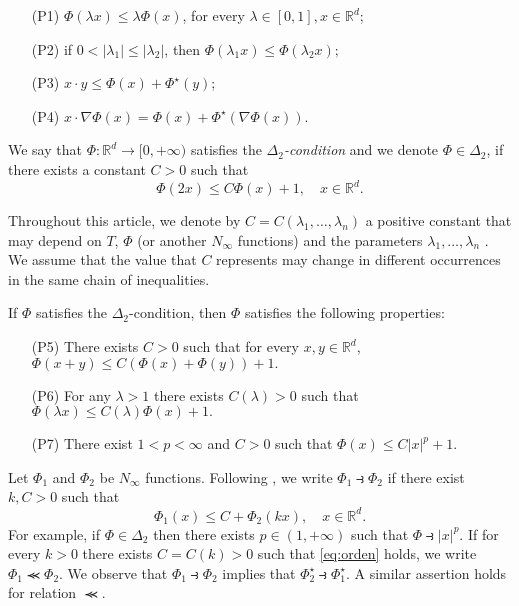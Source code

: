 \documentclass[twoside]{article}
\makeatletter
\theoremstyle{remark}
\newcounter{example}[section]
\def\namedlabel#1#2{\begingroup
    #2%
    \def\@currentlabel{#2}%
    \phantomsection\label{#1}\endgroup
}
\newcommand{\rr}{\mathbb{R}}
\renewcommand{\leq}{\leqslant}
\makeatother
\begin{document}
 
\begin{enumerate}
 \item[\namedlabel{eq:escalar_ine}{(P1)}]   $\Phi(\lambda x)\leq \lambda\Phi(x)$, for every  $\lambda\in[0,1],x\in\rr^d$;
 \item[\namedlabel{eq:escalar_ine_2}{(P2)}] if $ 0<|\lambda_1|\leq |\lambda_2| $, then $\Phi(\lambda_1 x)\leq\Phi(\lambda_2 x);$
  \item[\namedlabel{eq:young-ine}{(P3)}] $x\cdot y\leq \Phi(x)+\Phi^{\star}(y)$;
  \item[\namedlabel{eq:young-id}{(P4)}] $x\cdot \nabla\Phi(x)= \Phi(x)+\Phi^{\star}(\nabla \Phi (x))$.
 
 
\end{enumerate}



We say that  $\Phi:\mathbb{R}^d\rightarrow [0,+\infty)$ satisfies the  \emph{$\Delta_2$-condition} and we denote  $\Phi \in \Delta_2$,
if there exists a  constant $C>0$  such that
\begin{equation}\label{delta2defi}\Phi(2x)\leq C \Phi(x)+1,\quad x\in\rr^d.
\end{equation}


Throughout this article, we denote by $C=C(\lambda_1,\ldots,\lambda_n)$ a positive constant that may depend on $T$, $\Phi$ (or another $N_{\infty}$ functions) and the parameters $\lambda_1,\ldots,\lambda_n$ . We assume that the value that $C$ represents may change in 
different occurrences in the same chain of inequalities. 




If $\Phi$ satisfies the $\Delta_2$-condition, then $\Phi$ satisfies the following properties:
\begin{enumerate}
 \item[\namedlabel{eq:quasi-sub-aditividad}{(P5)}] There exists $C>0$ such that for every $x,y\in \rr^d$, $\Phi(x+y)\leq C (\Phi(x)+\Phi(y))+1.$
\item[\namedlabel{{eq:delta2-lambda}}{(P6)}]  For any $\lambda>1$ there exists $C(\lambda)>0$ such that $\Phi(\lambda x)\leq C(\lambda)\Phi(x)+1.$
\item [\namedlabel{{eq:delta2-power}}{(P7)}] There exist $1<p<\infty$ and $C>0$ such that $\Phi(x)\leq C|x|^p+1$.

\end{enumerate}


Let $\Phi_1$ and $\Phi_2$ be   $N_{\infty}$ functions. Following  \cite{trudinger1974imbedding}, we write $\Phi_1\strictif\Phi_2$ if there exist  $k,C>0$ such that
\begin{equation}\label{eq:orden} \Phi_1(x)\leq C+\Phi_2(kx),\quad x\in\rr^d.\end{equation}
For example, if $\Phi \in \Delta_2$ then there exists $p\in (1,+\infty)$ such that $\Phi\strictif |x|^p$.  If for every $k>0$ there exists $C=C(k)>0$ such that \eqref{eq:orden} holds, we write  $\Phi_1\llcurly\Phi_2$.  We observe that  $\Phi_1\strictif \Phi_2$ implies that $\Phi^{\star}_2\strictif\Phi^{\star}_1$. A similar assertion holds for relation $\llcurly$. 
\end{document}
